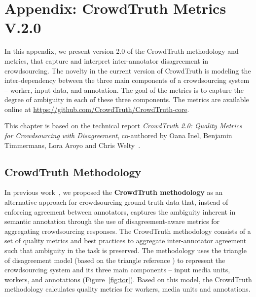 
\manualmark
{}

\renewcommand{\thesection}{\Alph{section}}

\appendix

\chapter*{Appendix: CrowdTruth Metrics V.2.0}

In this appendix, we present version 2.0 of the CrowdTruth methodology and metrics, that capture and interpret inter-annotator disagreement in crowdsourcing. The novelty in the current version of CrowdTruth is modeling the inter-dependency between the three main components of a crowdsourcing system -- worker, input data, and annotation. The goal of the metrics is to capture the degree of ambiguity in each of these three components. The metrics are available online at \url{https://github.com/CrowdTruth/CrowdTruth-core}.

This chapter is based on the technical report \textit{CrowdTruth 2.0: Quality Metrics for Crowdsourcing with Disagreement}, co-authored by Oana Inel, Benjamin Timmermans, Lora Aroyo and Chris Welty~\cite{dumitrache2018crowdtruth}.


\section{CrowdTruth Methodology}
\label{app:ct2.0}

In previous work~\cite{aroyo2015truth}, we proposed the \textbf{CrowdTruth methodology} as an alternative approach for crowdsourcing ground truth data that, instead of enforcing agreement between annotators, captures the ambiguity inherent in semantic annotation through the use of disagreement-aware metrics for aggregating crowdsourcing responses. The CrowdTruth methodology consists of a set of quality metrics and best practices to aggregate inter-annotator agreement such that ambiguity in the task is preserved. The methodology uses the triangle of disagreement model (based on the triangle reference \cite{knowlton1966definition}) to represent the crowdsourcing system and its three main components -- input media units, workers, and annotations (Figure~\ref{fig:tor}). Based on this model, the CrowdTruth methodology calculates quality metrics for workers, media units and annotations.

